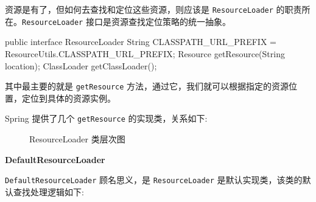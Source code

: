 资源是有了，但如何去查找和定位这些资源，则应该是 \texttt{ResourceLoader} 的职责所在。\texttt{ResourceLoader} 接口是资源查找定位策略的统一抽象。

\begin{Java}
public interface ResourceLoader {   
    String CLASSPATH_URL_PREFIX = ResourceUtils.CLASSPATH_URL_PREFIX;   
    Resource getResource(String location);   
    ClassLoader  getClassLoader();  
} 
\end{Java}

其中最主要的就是 \texttt{getResource} 方法，通过它，我们就可以根据指定的资源位置，定位到具体的资源实例。

Spring 提供了几个 \texttt{getResource} 的实现类，关系如下:

\begin{figure}[H]
    \scriptsize
    \centering
    \caption{ResourceLoader 类层次图}
    \label{fig:ResourceLoader 类层次图}
\end{figure}

\noindent\textbf{DefaultResourceLoader}

\texttt{DefaultResourceLoader} 顾名思义，是 \texttt{ResourceLoader} 是默认实现类，该类的默认查找处理逻辑如下:

